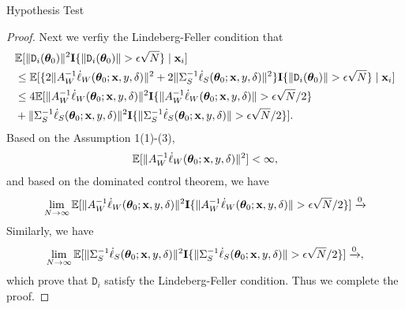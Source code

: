\documentclass[12pt,hidelinks]{article}
\begin{document}
\begin{section}{Hypothesis Test}
\begin{proof}
Next we verfiy the Lindeberg-Feller condition that 
\begin{align*}
    & \Exp[\|\mathtt{D}_i(\btheta_0)\|^2 \I\{\|\mathtt{D}_i(\btheta_0)\|> \epsilon \sqrt{N} \} \mid \x_i] \\
    & \leq \Exp[\{2 \|A_W^{-1} \dl_W(\btheta_0;\x, y, \delta) \|^2 + 2 \|\Sigma_S^{-1} \dl_S(\btheta_0;\x, y, \delta) \|^2\} \I\{\|\mathtt{D}_i(\btheta_0)\|> \epsilon \sqrt{N} \} \mid \x_i ] \\
    & \leq 4 \Exp[ \|A_W^{-1} \dl_W(\btheta_0;\x, y, \delta) \|^2 \I\{\|A_W^{-1} \dl_W(\btheta_0;\x, y, \delta) \| > \epsilon \sqrt{N}/2 \}\\
    &+  \|\Sigma_S^{-1} \dl_S(\btheta_0;\x, y, \delta) \|^2   \I\{\|\Sigma_S^{-1} \dl_S(\btheta_0;\x, y, \delta)  \| > \epsilon \sqrt{N}/2 \}].
\end{align*}
Based on the Assumption 1(1)-(3),
\begin{align*}
    \mathbb{E} [\|A_W^{-1} \dot \ell_W(\bm{\theta}_0;\mathbf{x}, y, \delta)\|^2] < \infty,
\end{align*}
and based on the dominated control theorem, we have
\begin{align*}
    \lim\limits_{N \rightarrow \infty} \mathbb{E}[ \|A_W^{-1} \dot \ell_W(\bm{\theta}_0;\mathbf{x}, y, \delta) \|^2 \mathbf{I}\{\|A_W^{-1} \dot \ell_W(\bm{\theta}_0;\mathbf{x}, y, \delta) \| > \epsilon \sqrt{N}/2 \}] \xrightarrow 0
\end{align*}
Similarly, we have
\begin{align*}
   \lim\limits_{N \rightarrow \infty}  \mathbb{E}[\|\Sigma_S^{-1} \dot \ell_S(\bm{\theta}_0;\mathbf{x}, y, \delta) \|^2   \mathbf{I}\{\|\Sigma_S^{-1} \dot \ell_S(\bm{\theta}_0;\mathbf{x}, y, \delta)  \| > \epsilon \sqrt{N}/2 \}] \xrightarrow 0,
\end{align*}
which prove that $\mathtt{D}_i$ satisfy the Lindeberg-Feller condition.
Thus we complete the proof.
\end{proof}


\end{section}
\end{document}
